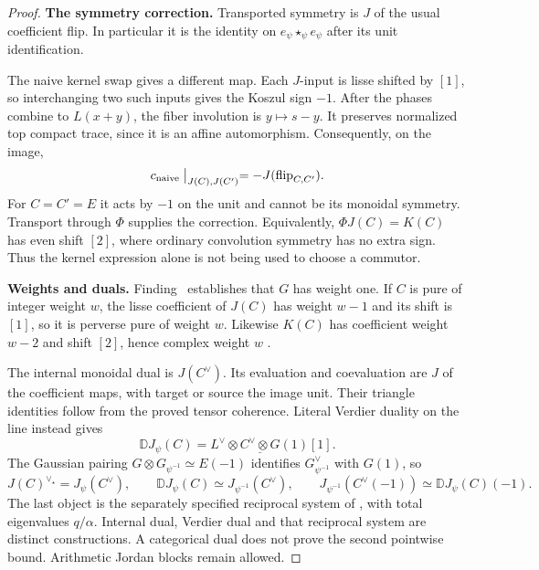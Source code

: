 \begin{proof}
\par\smallskip\noindent\textbf{The symmetry correction.}\quad
Transported symmetry is $J$ of the usual coefficient flip.
In particular it is the identity on $e_\psi\star_\psi e_\psi$
after its unit identification.

The naive kernel swap gives a different map.
Each $J$-input is lisse shifted by $[1]$, so interchanging
two such inputs gives the Koszul sign $-1$.
After the phases combine to $L(x+y)$, the fiber involution
is $y\mapsto s-y$. It preserves normalized top compact
trace, since it is an affine automorphism.
Consequently, on the image,
\[
 c_{\mathrm{naive}}\bigm|_{J(C),J(C')}
       =-J(\operatorname{flip}_{C,C'}).
\]
For $C=C'=E$ it acts by $-1$ on the unit and cannot be its
monoidal symmetry. Transport through $\Phi$ supplies
the correction. Equivalently, $\Phi J(C)=K(C)$ has
even shift $[2]$, where ordinary convolution symmetry
has no extra sign.
Thus the kernel expression alone is not being used
to choose a commutor.

\par\smallskip\noindent\textbf{Weights and duals.}\quad
Finding~ establishes that $G$ has weight one.
If $C$ is pure of integer weight $w$, the lisse
coefficient of $J(C)$ has weight $w-1$ and its shift
is $[1]$, so it is perverse pure of weight $w$.
Likewise $K(C)$ has coefficient weight $w-2$ and
shift $[2]$, hence complex weight $w$
\cite[5.1.8, pp.~126--127]{BBD}.

The internal monoidal dual is $J(C^\vee)$.
Its evaluation and coevaluation are $J$ of the
coefficient maps, with target or source the image unit.
Their triangle identities follow from the proved
tensor coherence.
Literal Verdier duality on the line instead gives
\[
 \mathbb D J_\psi(C)
   =L^\vee\otimes\underline{C^\vee\otimes G}(1)[1].
\]
The Gaussian pairing
$G\otimes G_{\psi^{-1}}\simeq E(-1)$ identifies
$G_{\psi^{-1}}^\vee$ with $G(1)$, so
\begin{equation}\label{eq:gaussianthreeduals}
 J(C)^{\vee_\star}=J_\psi(C^\vee),\qquad
 \mathbb D J_\psi(C)\simeq J_{\psi^{-1}}(C^\vee),\qquad
 J_{\psi^{-1}}(C^\vee(-1))
       \simeq\mathbb D J_\psi(C)(-1).
\end{equation}
The last object is the separately specified reciprocal
system of , with total eigenvalues $q/\alpha$.
Internal dual, Verdier dual and that reciprocal system
are distinct constructions. A categorical dual does not
prove the second pointwise bound.
Arithmetic Jordan blocks remain allowed.


\end{proof}
